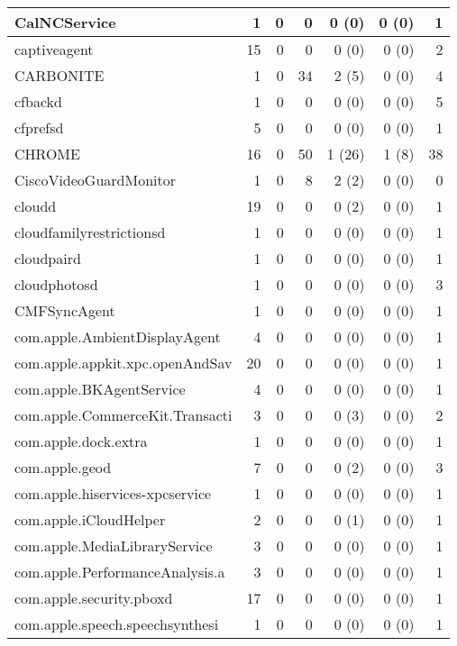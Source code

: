 \begin{adjustwidth}{-2in}{}
\begin{scriptsize}
\begin{longtable}[l]{ l | r | r | r | r | r | r }
    CalNCService & 1 &  0 &  0 &  0 (0) &  0 (0) &  1 \\ \hline
    captiveagent &  15 &  0 &  0 &  0 (0) &  0 (0) &  2 \\ \hline
    CARBONITE &  1 &  0 & 34 &  2 (5) &  0 (0) &  4 \\ \hline
    cfbackd &  1 &  0 &  0 &  0 (0) &  0 (0) &  5 \\ \hline
    cfprefsd & 5 &  0 &  0 &  0 (0) &  0 (0) &  1 \\ \hline
    CHROME &  16 &  0 & 50 & 1 (26) &  1 (8) & 38 \\ \hline
    CiscoVideoGuardMonitor & 1 &  0 &  8 &  2 (2) &  0 (0) &  0 \\ \hline
    cloudd &  19 &  0 &  0 &  0 (2) &  0 (0) &  1 \\ \hline
    cloudfamilyrestrictionsd & 1 &  0 &  0 &  0 (0) &  0 (0) &  1 \\ \hline
    cloudpaird & 1 &  0 &  0 &  0 (0) &  0 (0) &  1 \\ \hline
    cloudphotosd & 1 &  0 &  0 &  0 (0) &  0 (0) &  3 \\ \hline
    CMFSyncAgent & 1 &  0 &  0 &  0 (0) &  0 (0) &  1 \\ \hline
    com.apple.AmbientDisplayAgent &  4 &  0 &  0 &  0 (0) &  0 (0) &  1 \\ \hline
    com.apple.appkit.xpc.openAndSav & 20 &  0 &  0 &  0 (0) &  0 (0) &  1 \\ \hline
    com.apple.BKAgentService & 4 &  0 &  0 &  0 (0) &  0 (0) &  1 \\ \hline
    com.apple.CommerceKit.Transacti &  3 &  0 &  0 &  0 (3) &  0 (0) &  2 \\ \hline
    com.apple.dock.extra & 1 &  0 &  0 &  0 (0) &  0 (0) &  1 \\ \hline
    com.apple.geod & 7 &  0 &  0 &  0 (2) &  0 (0) &  3 \\ \hline
    com.apple.hiservices-xpcservice &  1 &  0 &  0 &  0 (0) &  0 (0) &  1 \\ \hline
    com.apple.iCloudHelper & 2 &  0 &  0 &  0 (1) &  0 (0) &  1 \\ \hline
    com.apple.MediaLibraryService &  3 &  0 &  0 &  0 (0) &  0 (0) &  1 \\ \hline
    com.apple.PerformanceAnalysis.a &  3 &  0 &  0 &  0 (0) &  0 (0) &  1 \\ \hline
    com.apple.security.pboxd &  17 &  0 &  0 &  0 (0) &  0 (0) &  1 \\ \hline
    com.apple.speech.speechsynthesi &  1 &  0 &  0 &  0 (0) &  0 (0) &  1 \\ \hline

\end{longtable}
\end{scriptsize}
\end{adjustwidth}
